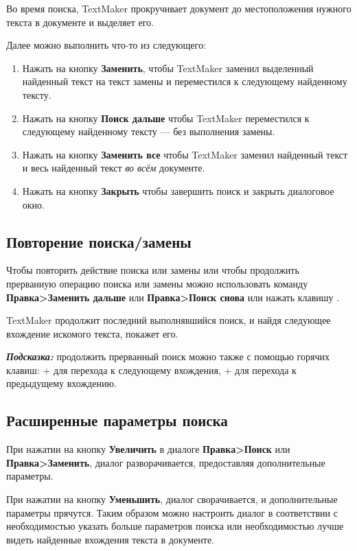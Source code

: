 ﻿\documentclass[a4paper,10pt]{article}
\begin{document}
Во время поиска, TextMaker прокручивает документ до местоположения нужного текста в документе и выделяет его.

Далее можно выполнить что-то из следующего:

\begin{enumerate}[label=\Alph*]
 \item Нажать на кнопку \textbf{Заменить}, чтобы TextMaker заменил выделенный найденный текст на текст замены и переместился к следующему найденному тексту.
 \item Нажать на кнопку \textbf{Поиск дальше} чтобы TextMaker переместился к следующему найденному тексту — без выполнения замены.
 \item Нажать на кнопку \textbf{Заменить все} чтобы TextMaker заменил найденный текст и весь найденный текст \textit{во всём} документе.
 \item Нажать на кнопку \textbf{Закрыть} чтобы завершить поиск и закрыть диалоговое окно.
\end{enumerate}

\subsection{Повторение поиска/замены}
Чтобы повторить действие поиска или замены или чтобы продолжить прерванную операцию поиска или замены можно использовать команду \textbf{Правка>Заменить дальше} или \textbf{Правка>Поиск снова} или нажать клавишу .

TextMaker продолжит последний выполнявшийся поиск, и найдя следующее вхождение искомого текста, покажет его.

\begin{mdframed}[backgroundcolor=blue!10]
\textbf{\textit{Подсказка:}} продолжить прерванный поиск можно также с помощью горячих клавиш: + для перехода к следующему вхождения, + для перехода к предыдущему вхождению.
\end{mdframed}

\subsection{Расширенные параметры поиска} \label{sec:расшпарампоиска}
При нажатии на кнопку \textbf{Увеличить} в диалоге \textbf{Правка>Поиск} или \textbf{Правка>Заменить}, диалог разворачивается, предоставляя дополнительные параметры.

При нажатии на кнопку \textbf{Уменьшить}, диалог сворачивается, и дополнительные параметры прячутся. Таким образом можно настроить диалог в соответствии с необходимостью указать больше параметров поиска или необходимостью лучше видеть найденные вхождения текста в документе.
\end{document}

